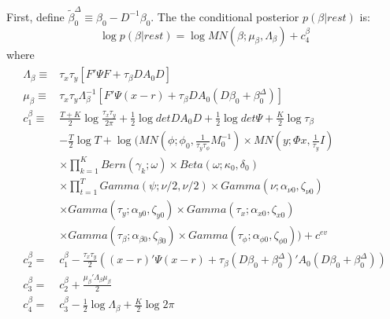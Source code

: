 \documentclass[11pt]{article}
\begin{document}
First, define $\tilde{\beta}_{0}^{\Delta}\equiv\beta_{0}-D^{-1}\beta_{0}$. The the conditional posterior $p\left(\beta|rest\right)$ is:
\begin{equation}
	\log p\left(\beta|rest\right)=\log MN\left(\beta;\mu_{\beta},\Lambda_{\beta}\right)+c_{4}^{\beta}
\end{equation}
where
\begin{align*}
\begin{split}
	\Lambda_{\beta}\equiv&\tau_{x}\tau_{y}\left[F'\Psi F+\tau_{\beta}DA_{0}D\right]\\\mu_{\beta}\equiv&\tau_{x}\tau_{y}\Lambda_{\beta}^{-1}\left[F'\Psi\left(x-r\right)+\tau_{\beta}DA_{0}\left(D\beta_{0}+\beta_{0}^{\Delta}\right)\right]\\c_{1}^{\beta}\equiv&\frac{T+K}{2}\log\frac{\tau_{x}\tau_{y}}{2\pi}+\frac{1}{2}\log detDA_{0}D+\frac{1}{2}\log det\Psi+\frac{K}{2}\log\tau_{\beta}\\&-\frac{T}{2}\log T+\log\Bigg(MN\left(\phi;\phi_{0},\frac{1}{\tau_{y}\tau_{\phi}}M_{0}^{-1}\right)\times MN\left(y;\Phi x,\frac{1}{\tau_{y}}I\right)\\&\times\prod_{k=1}^{K}Bern\left(\gamma_{k};\omega\right)\times Beta\left(\omega;\kappa_{0},\delta_{0}\right)\\&\times\prod_{t=1}^{T}Gamma\left(\psi;\nu/2,\nu/2\right)\times Gamma\left(\nu;\alpha_{\nu0},\zeta_{\nu0}\right)\\&\times Gamma\left(\tau_{y};\alpha_{y0},\zeta_{y0}\right)\times Gamma\left(\tau_{x};\alpha_{x0},\zeta_{x0}\right)\\&\times Gamma\left(\tau_{\beta};\alpha_{\beta0},\zeta_{\beta0}\right)\times Gamma\left(\tau_{\phi};\alpha_{\phi0},\zeta_{\phi0}\right)\Bigg)+c^{ev}\\c_{2}^{\beta}=&c_{1}^{\beta}-\frac{\tau_{x}\tau_{y}}{2}\left(\left(x-r\right)'\Psi\left(x-r\right)+\tau_{\beta}\left(D\beta_{0}+\beta_{0}^{\Delta}\right)'A_{0}\left(D\beta_{0}+\beta_{0}^{\Delta}\right)\right)\\c_{3}^{\beta}=&c_{2}^{\beta}+\frac{\mu_{\beta}'\Lambda_{\beta}\mu_{\beta}}{2}\\c_{4}^{\beta}=&c_{3}^{\beta}-\frac{1}{2}\log\Lambda_{\beta}+\frac{K}{2}\log2\pi
\end{split}
\end{align*}
\end{document}
